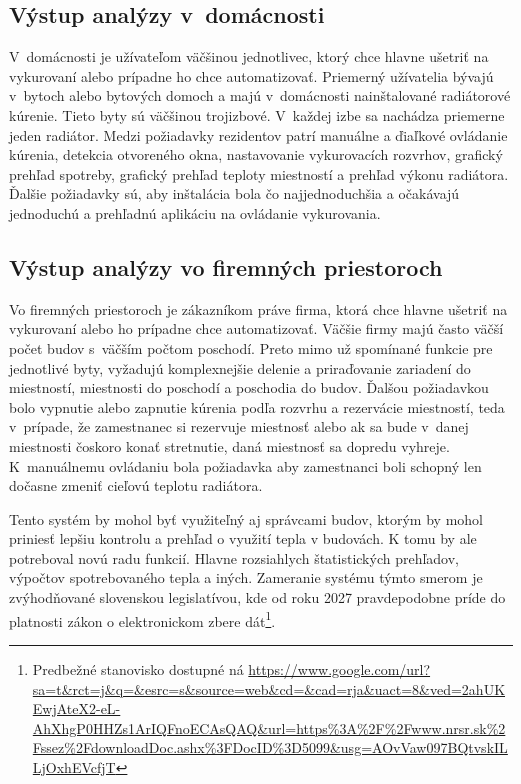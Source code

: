 \subsection{Výstup analýzy v~domácnosti}\label{analyza-user-home}
V~domácnosti je užívateľom väčšinou jednotlivec, ktorý chce hlavne ušetriť na vykurovaní alebo prípadne ho chce automatizovať. 
Priemerný užívatelia bývajú v~bytoch alebo bytových domoch a majú v~domácnosti nainštalované radiátorové kúrenie. Tieto byty sú väčšinou trojizbové. 
V~každej izbe sa nachádza priemerne jeden radiátor. 
Medzi požiadavky rezidentov patrí manuálne a ďiaľkové ovládanie kúrenia, detekcia otvoreného okna, nastavovanie vykurovacích rozvrhov, grafický prehľad spotreby, grafický prehľad teploty miestností a prehľad výkonu radiátora. 
Ďalšie požiadavky sú, aby inštalácia bola čo najjednoduchšia a očakávajú jednoduchú a prehľadnú aplikáciu na ovládanie vykurovania. 

\subsection{Výstup analýzy vo firemných priestoroch}\label{analyza-user-bussiness}
Vo firemných priestoroch je zákazníkom práve firma, ktorá chce hlavne ušetriť na vykurovaní alebo ho prípadne chce automatizovať.
Väčšie firmy majú často väčší počet budov s~väčším počtom poschodí.
Preto mimo už spomínané funkcie pre jednotlivé byty, vyžadujú komplexnejšie delenie a priraďovanie zariadení do miestností, miestnosti do poschodí a poschodia do budov. 
Ďalšou požiadavkou bolo vypnutie alebo zapnutie kúrenia podľa rozvrhu a rezervácie miestností, teda v~prípade, že zamestnanec si rezervuje miestnosť alebo ak sa bude v~danej miestnosti čoskoro konať stretnutie, daná miestnosť sa dopredu vyhreje.
K~manuálnemu ovládaniu bola požiadavka aby zamestnanci boli schopný len dočasne zmeniť cieľovú teplotu radiátora. 

Tento systém by mohol byť využiteľný aj správcami budov, ktorým by mohol priniesť lepšiu kontrolu a prehľad o využití tepla v budovách. K tomu by ale potreboval novú radu funkcií. Hlavne rozsiahlych štatistických prehľadov, výpočtov spotrebovaného tepla a iných. Zameranie systému týmto smerom je zvýhodňované slovenskou legislatívou, kde od roku 2027 pravdepodobne príde do platnosti zákon o elektronickom zbere dát\footnote{Predbežné stanovisko dostupné ná \url{https://www.google.com/url?sa=t&rct=j&q=&esrc=s&source=web&cd=&cad=rja&uact=8&ved=2ahUKEwjAteX2-eL-AhXhgP0HHZs1ArIQFnoECAsQAQ&url=https\%3A\%2F\%2Fwww.nrsr.sk\%2Fssez\%2FdownloadDoc.ashx\%3FDocID\%3D5099&usg=AOvVaw097BQtvskILLjOxhEVcfjT}}.

